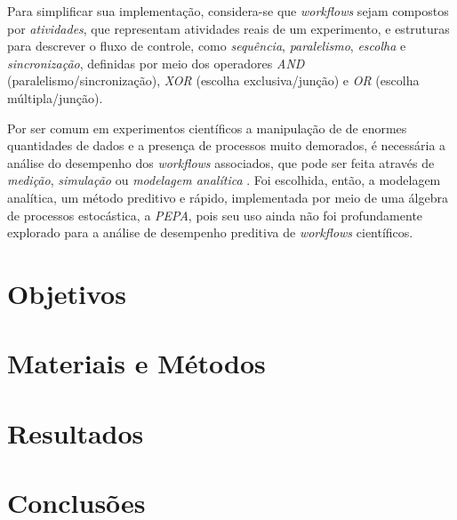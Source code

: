 \documentclass[a4paper,11pt]{article}
\begin{document}
    Para simplificar sua implementação, considera-se que \emph{workflows} sejam compostos por \emph{atividades}, que representam atividades reais de um experimento, e estruturas para descrever o fluxo de controle, como \emph{sequência}, \emph{paralelismo}, \emph{escolha} e \emph{sincronização}, definidas por meio dos operadores \emph{AND} (paralelismo/sincronização), \emph{XOR} (escolha exclusiva/junção) e \emph{OR} (escolha múltipla/junção).

        Por ser comum em experimentos científicos a manipulação de de enormes quantidades de dados e a presença de processos muito demorados, é necessária a análise do desempenho dos \emph{workflows} associados, que pode ser feita através de \emph{medição}, \emph{simulação} ou \emph{modelagem analítica} \cite{phd:kelly11}. Foi escolhida, então, a modelagem analítica, um método preditivo e rápido, implementada por meio de uma álgebra de processos estocástica, a \emph{PEPA}, pois seu uso ainda não foi profundamente explorado para a análise de desempenho preditiva de \emph{workflows} científicos.

    \section{Objetivos}
    \section{Materiais e Métodos}
    \section{Resultados}
    \section{Conclusões}


    
    
\end{document}
